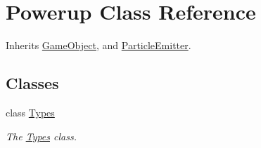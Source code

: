 \hypertarget{class_powerup}{\section{Powerup Class Reference}
\label{class_powerup}
}


Inherits \hyperlink{class_game_object}{Game\+Object}, and \hyperlink{class_particle_emitter}{Particle\+Emitter}.

\subsection*{Classes}
\begin{DoxyCompactItemize}
\item 
class \hyperlink{class_powerup_1_1_types}{Types}
\begin{DoxyCompactList}\small\item\em The \hyperlink{class_powerup_1_1_types}{Types} class. \end{DoxyCompactList}\end{DoxyCompactItemize}
